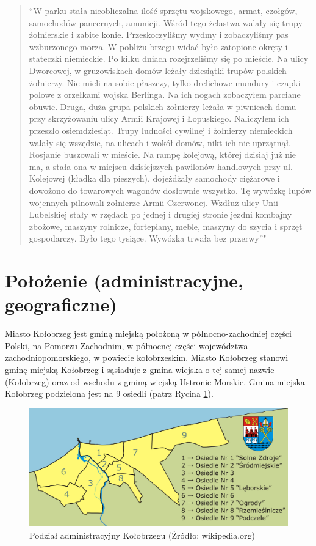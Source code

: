 \documentclass{amuthesis}
\begin{document}
\begin{quote}
``W parku stała nieobliczalna ilość sprzętu wojskowego, armat, czołgów, samochodów pancernych, amunicji. Wśród tego żelastwa walały się trupy żołnierskie i zabite konie. Przeskoczyliśmy wydmy i zobaczyliśmy pas wzburzonego morza. W pobliżu brzegu widać było zatopione okręty i stateczki niemieckie. Po kilku dniach rozejrzeliśmy się po mieście. Na ulicy Dworcowej, w gruzowiskach domów leżały dziesiątki trupów polskich żołnierzy. Nie mieli na sobie płaszczy, tylko drelichowe mundury i czapki polowe z orzełkami wojska Berlinga. Na ich nogach zobaczyłem parciane obuwie. Druga, duża grupa polskich żołnierzy leżała w piwnicach domu przy skrzyżowaniu ulicy Armii Krajowej i Łopuskiego. Naliczyłem ich przeszło osiemdziesiąt. Trupy ludności cywilnej i żołnierzy niemieckich walały się wszędzie, na ulicach i wokół domów, nikt ich nie uprzątnął.
Rosjanie buszowali w mieście. Na rampę kolejową, której dzisiaj już nie ma, a stała ona w miejscu dzisiejszych pawilonów handlowych przy ul. Kolejowej (kładka dla pieszych), dojeżdżały samochody ciężarowe i dowożono do towarowych wagonów dosłownie wszystko. Tę wywózkę łupów wojennych pilnowali żołnierze Armii Czerwonej. Wzdłuż ulicy Unii Lubelskiej stały w rzędach po jednej i drugiej stronie jezdni kombajny zbożowe, maszyny rolnicze, fortepiany, meble, maszyny do szycia i sprzęt gospodarczy. Było tego tysiące. Wywózka trwała bez przerwy''"
\end{quote}

\hypertarget{polozenie}{%
\section{Położenie (administracyjne, geograficzne)}\label{polozenie}}

Miasto Kołobrzeg jest gminą miejską położoną w północno-zachodniej części Polski, na Pomorzu Zachodnim, w północnej części województwa zachodniopomorskiego, w powiecie
kołobrzeskim.
Miasto Kołobrzeg stanowi gminę miejską Kołobrzeg i sąsiaduje z gmina wiejska o tej samej nazwie (Kołobrzeg) oraz od wschodu z gminą wiejską Ustronie Morskie.
Gmina miejska Kołobrzeg podzielona jest na 9 osiedli (patrz Rycina \ref{fig:ryc8}).

\begin{figure}[t]

{\centering \includegraphics[width=1.05\linewidth]{figures/Kolobrzeg_administrative_division_2005} 

}

\caption{Podział administracyjny Kołobrzegu (Źródło: wikipedia.org)}\label{fig:ryc8}
\end{figure}
\end{document}
